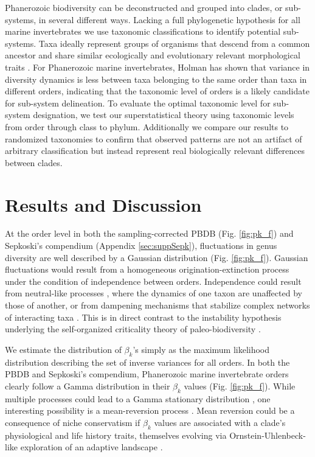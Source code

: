 \documentclass[12pt]{article}
\let\citep=\autocite
\begin{document}
Phanerozoic biodiversity can be deconstructed and grouped into clades,
or sub-systems, in several different ways. Lacking a full phylogenetic
hypothesis for all marine invertebrates we use taxonomic
classifications to identify potential sub-systems.  Taxa ideally
represent groups of organisms that descend from a common ancestor and
share similar ecologically and evolutionary relevant morphological
traits \citep{mayr1965systZool, erwin2007}.  For Phanerozoic marine
invertebrates, Holman \citep{holman1989} has shown that variance in
diversity dynamics is less between taxa belonging to the same order
than taxa in different orders, indicating that the taxonomic level of
orders is a likely candidate for sub-system delineation. To evaluate
the optimal taxonomic level for sub-system designation, we test our
superstatistical theory using taxonomic levels from order through
class to phylum. Additionally we compare our results to randomized
taxonomies to confirm that observed patterns are not an artifact of
arbitrary classification but instead represent real biologically
relevant differences between clades.



\section{Results and Discussion}
At the order level in both the sampling-corrected PBDB
(Fig. \ref{fig:pk_f}) and Sepkoski's compendium (Appendix
\ref{sec:suppSepk}), fluctuations in genus diversity are well
described by a Gaussian distribution (Fig. \ref{fig:pk_f}). Gaussian
fluctuations would result from a homogeneous origination-extinction
process under the condition of independence between
orders. Independence could result from neutral-like processes
\citep{hubbell2001}, where the dynamics of one taxon are unaffected by
those of another, or from dampening mechanisms that stabilize complex
networks of interacting taxa \citep{brose2005}. This is in direct
contrast to the instability hypothesis underlying the self-organized
criticality theory of paleo-biodiversity \citep{bak1993, sole1997}.

We estimate the distribution of $\beta_k$'s simply as the maximum
likelihood distribution describing the set of inverse variances for
all orders. In both the PBDB and Sepkoski's compendium, Phanerozoic
marine invertebrate orders clearly follow a Gamma distribution in
their $\beta_k$ values (Fig. \ref{fig:pk_f}).  While multiple
processes could lead to a Gamma stationary distribution
\citep[e.g.][]{cir1985}, one interesting possibility is a
mean-reversion process \citep{cir1985}. Mean reversion could be a
consequence of niche conservatism if $\beta_k$ values are associated
with a clade's physiological and life history traits, themselves
evolving via Ornstein-Uhlenbeck-like exploration of an adaptive
landscape \citep{cir1985, butler2004}.
\end{document}
